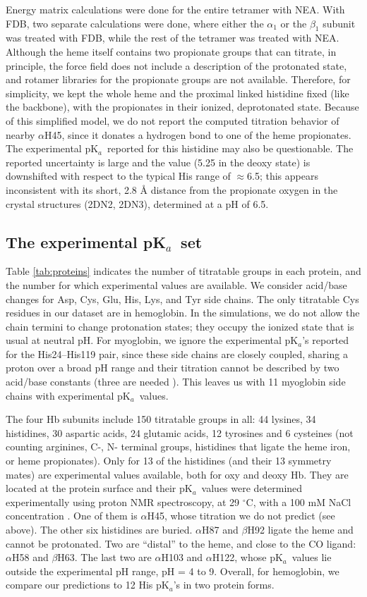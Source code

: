 \documentclass[a4paper,12pt]{article}
\newcommand{\pk}{pK$_a$}
\begin{document}
Energy matrix calculations were done for the entire tetramer with NEA. With FDB, two separate calculations were done,
where either the $\alpha_1$ or the $\beta_1$ subunit was treated with FDB, while the rest of the tetramer was treated
with NEA. Although the heme itself contains two propionate groups that can titrate, in principle, the force field does
not include a description of the protonated state, and rotamer libraries for the propionate groups are not available.
Therefore, for simplicity, we kept the whole heme and the proximal linked histidine fixed (like the backbone), with
the propionates in their ionized, deprotonated state. Because of this simplified model, we do not report the
computed titration behavior of nearby $\alpha$H45, since it donates a hydrogen bond to one of the heme propionates.
The experimental \pk\ reported for this histidine \cite{Ho10} may also be questionable. The reported uncertainty is
large \cite{Zheng13} and the value (5.25 in the deoxy state) is downshifted with respect to the typical His range of
$\approx$6.5; this appears inconsistent with its short, 2.8 {\AA} distance from the propionate oxygen in the crystal
structures (2DN2, 2DN3), determined at a pH of 6.5.

\subsection{The experimental \pk\ set}
Table \ref{tab:proteins} indicates the number of titratable groups in each protein, and the number for which experimental
values are available. We consider acid/base changes for Asp, Cys, Glu, His, Lys, and Tyr side chains. The only titratable
Cys residues in our dataset are in hemoglobin. In the simulations, we do not allow the chain termini to change
protonation states; they occupy the ionized state that is usual at neutral pH. For myoglobin, we ignore the experimental
\pk's reported for the His24--His119 pair, since these side chains are closely coupled, sharing a proton over a broad
pH range and their titration cannot be described by two acid/base constants (three are needed \cite{Polydorides13}).
This leaves us with 11 myoglobin side chains with experimental \pk\ values.

The four Hb subunits include 150 titratable groups in all: 44 lysines, 34 histidines, 30 aspartic acids, 24 glutamic
acids, 12 tyrosines and 6 cysteines (not counting arginines, C-, N- terminal groups, histidines that ligate the heme
iron, or heme propionates). Only for 13 of the histidines (and their 13 symmetry mates) are experimental values available,
both for oxy and deoxy Hb. They are located at the protein surface and their \pk\ values were determined experimentally 
using proton NMR spectroscopy, at 29 $^{\circ}$C, with a 100 mM NaCl concentration \cite{Fang99}. One of them is $\alpha$H45,
whose titration we do not predict (see above). The other six histidines are buried. $\alpha$H87 and $\beta$H92 ligate
the heme and cannot be protonated. Two are ``distal'' to the heme, and close to the CO ligand: $\alpha$H58 and $\beta$H63.
The last two are $\alpha$H103 and $\alpha$H122, whose \pk\ values lie outside the experimental pH range, pH = 4 to 9.
Overall, for hemoglobin, we compare our predictions to 12 His \pk's in two protein forms.
\end{document}
